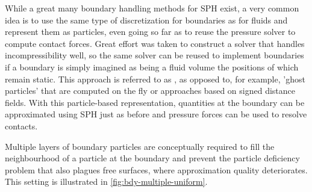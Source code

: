 While a great many boundary handling methods for SPH exist, a very common idea is to use the same type of discretization for boundaries as for fluids and represent them as particles, even going so far as to reuse the pressure solver to compute contact forces\autocite*{versatile-boundary-akinci12}. Great effort was taken to construct a solver that handles incompressibility well, so the same solver can be reused to implement boundaries if a boundary is simply imagined as being a fluid volume the positions of which remain static. This approach is referred to as , as opposed to, for example, 'ghost particles' that are computed on the fly\autocite*{versatile-boundary-akinci12} or approaches based on signed distance fields\autocite*{density-maps-koschier}. With this particle-based representation, quantities at the boundary can be approximated using SPH just as before and pressure forces can be used to resolve contacts.

Multiple layers of boundary particles are conceptually required to fill the neighbourhood of a particle at the boundary and prevent the particle deficiency problem that also plagues free surfaces, where approximation quality deteriorates. This setting is illustrated in \autoref{fig:bdy-multiple-uniform}.

